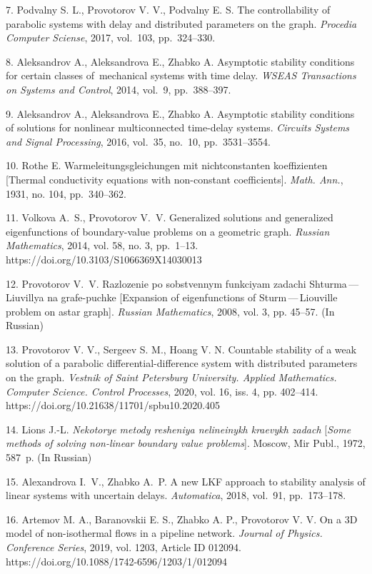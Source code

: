 {7. Podvalny S. L., Provotorov V. V., Podvalny E. S.  The controllability of parabolic systems with delay and distributed parameters on the graph. \emph{Procedia Computer Sciense}, 2017, vol.~103, pp.~324--330.

8. Aleksandrov A., Aleksandrova E., Zhabko A. Asymptotic stability conditions for certain classes of~mechanical systems with time delay. \emph{WSEAS Transactions on Systems and Control}, 2014, vol.~9, pp.~388--397.

9. Aleksandrov A., Aleksandrova E., Zhabko A. Asymptotic stability conditions of solutions for nonlinear multiconnected time-delay systems. \emph{Circuits  Systems and Signal Processing}, 2016, vol.~35, no.~10, pp.~3531--3554.

10. Rothe E. Warmeleitungsgleichungen mit nichtconstanten koeffizienten [Thermal conductivity equations with non-constant coefficients]. {\it Math. Ann.},  1931, no. 104, pp.~340--362.

11. Volkova A.~S., Provotorov V.~V.  Generalized solutions and generalized eigenfunctions of boundary-value problems on a geometric graph. \emph{Russian Mathematics}, 2014, vol. 58, no. 3,  pp.~1--13.\\  https://doi.org/10.3103/S1066369X14030013

12. Provotorov V.~V. Razlozenie po sobstvennym funkciyam zadachi Shturma\,---\,Liuvillya na grafe-puchke [Expansion  of eigenfunctions of Sturm\,---\,Liouville problem on astar graph]. \emph{Russian Mathematics}, 2008, vol. 3, pp. 45--57. (In Russian)

13. Provotorov V. V., Sergeev S. M., Hoang V. N. Countable stability of a weak solution of a parabolic differential-difference system with distributed parameters on the graph. \emph{Vestnik of Saint Petersburg University. Applied Mathematics. Computer Science. Control Processes}, 2020, vol. 16, iss. 4, pp. 402--414. https://doi.org/10.21638/11701/spbu10.2020.405

14. Lions J.-L. \textit{Nekotorye metody resheniya nelineinykh kraevykh zadach} [\textit{Some methods of solving non-linear boundary value problems}]. Moscow, Mir Publ., 1972, 587~p. (In Russian)

15. Alexandrova I.~V., Zhabko A.~P.  A new LKF approach to stability analysis of linear systems with uncertain delays. \emph{Automatica}, 2018, vol.~91, pp.~173--178.

16. Artemov M. A.,  Baranovskii E. S., Zhabko A. P., Provotorov V. V.  On a 3D model of non-isothermal flows in a pipeline network. \emph{Journal of Physics. Conference Series}, 2019, vol. 1203, Article ID 012094. https://doi.org/10.1088/1742-6596/1203/1/012094

}
